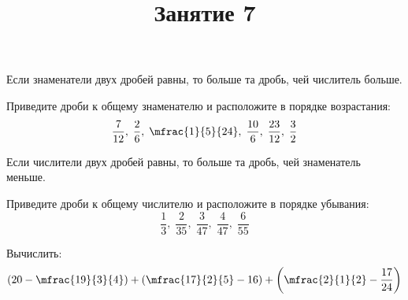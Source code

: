 \begin{definit}
	Если знаменатели двух дробей равны, то больше та дробь, чей числитель больше.
\end{definit}
\begin{listofex}[resume]
	\item Приведите дроби к общему знаменателю и расположите в порядке возрастания:
	\[ \dfrac{7}{12},\;\dfrac{2}{6},\;\mfrac{1}{5}{24},\;\dfrac{10}{6},\;\dfrac{23}{12},\;\dfrac{3}{2} \]
\end{listofex}
\begin{definit}
	Если числители двух дробей равны, то больше та дробь, чей знаменатель меньше.
\end{definit}
\begin{listofex}[resume]
	\item Приведите дроби к общему числителю и расположите в порядке убывания:
	\[ \dfrac{1}{3},\;\dfrac{2}{35},\;\dfrac{3}{47},\;\dfrac{4}{47},\;\dfrac{6}{55} \]
	\item Вычислить: \[ \left( 20-\mfrac{19}{3}{4} \right)+\left( \mfrac{17}{2}{5}-16 \right)+\left( \mfrac{2}{1}{2}-\dfrac{17}{24} \right) \]
\end{listofex}
\setcounter{definit}{0}
\newpage
\title{Занятие 7}
